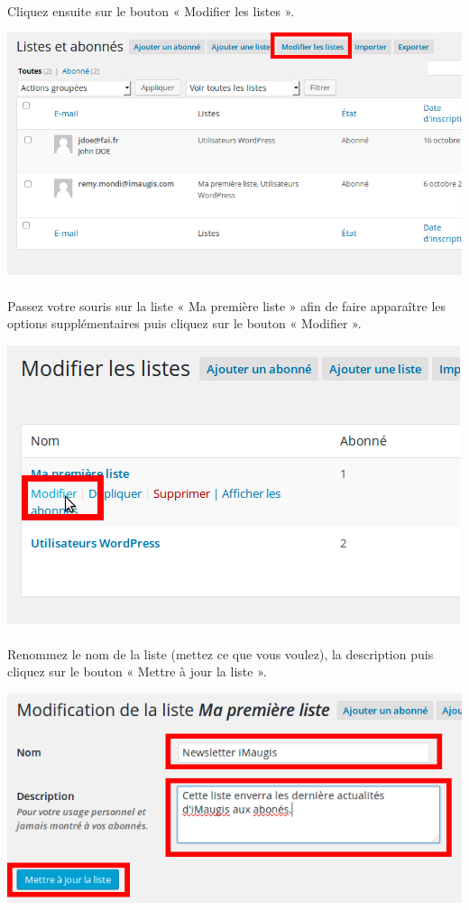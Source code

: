 \documentclass[10pt,a4paper]{article}
\begin{document}
\paragraph{}Cliquez ensuite sur le bouton « Modifier les listes ».
\begin{center}
\includegraphics[scale=0.3]{img/0207.png}
\end{center}
\paragraph{}Passez votre souris sur la liste « Ma première liste » afin de faire apparaître les options supplémentaires puis cliquez sur le bouton « Modifier ».
\begin{center}
\includegraphics[scale=0.3]{img/0208.png}
\end{center}
\paragraph{}Renommez le nom de la liste (mettez ce que vous voulez), la description puis cliquez sur le bouton « Mettre à jour la liste ».
\begin{center}
\includegraphics[scale=0.3]{img/0209.png}
\end{center}
\end{document}
